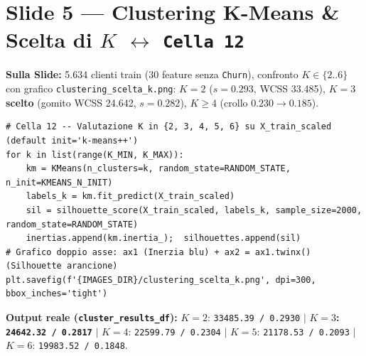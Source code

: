 \documentclass[10pt, a4paper]{article}
\begin{document}
\section*{Slide 5 --- Clustering K-Means \& Scelta di $K$ $\leftrightarrow$ \texttt{Cella 12}}
\noindent\textbf{Sulla Slide:} 5.634 clienti train (30 feature senza \texttt{Churn}), confronto $K \in \{2..6\}$ con grafico \texttt{clustering\_\allowbreak scelta\_k.png}: $K=2$ ($s=0.293$, WCSS 33.485), \textbf{$K=3$ scelto} (gomito WCSS 24.642, $s=0.282$), $K\ge 4$ (crollo $0.230 \rightarrow 0.185$).
\begin{lstlisting}
# Cella 12 -- Valutazione K in {2, 3, 4, 5, 6} su X_train_scaled (default init='k-means++')
for k in list(range(K_MIN, K_MAX)):
    km = KMeans(n_clusters=k, random_state=RANDOM_STATE, n_init=KMEANS_N_INIT)
    labels_k = km.fit_predict(X_train_scaled)
    sil = silhouette_score(X_train_scaled, labels_k, sample_size=2000, random_state=RANDOM_STATE)
    inertias.append(km.inertia_);  silhouettes.append(sil)
# Grafico doppio asse: ax1 (Inerzia blu) + ax2 = ax1.twinx() (Silhouette arancione)
plt.savefig(f'{IMAGES_DIR}/clustering_scelta_k.png', dpi=300, bbox_inches='tight')
\end{lstlisting}
\noindent\textbf{Output reale (\texttt{cluster\_results\_df}):} $K=2$: \texttt{33485.39 / 0.2930} $|$ \textbf{$K=3$: \texttt{24642.32 / 0.2817}} $|$ $K=4$: \texttt{22599.79 / 0.2304} $|$ $K=5$: \texttt{21178.53 / 0.2093} $|$ $K=6$: \texttt{19983.52 / 0.1848}.
\end{document}
